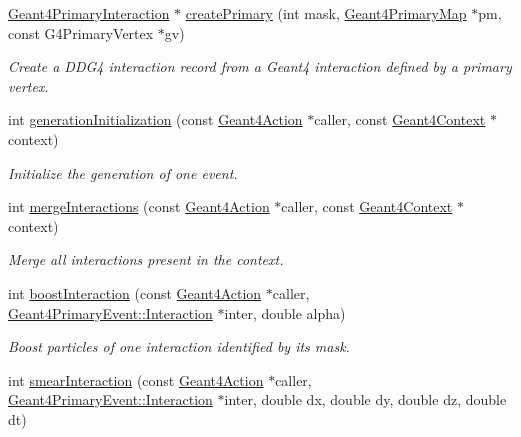 \begin{DoxyCompactItemize}
\hyperlink{class_d_d4hep_1_1_simulation_1_1_geant4_primary_interaction}{Geant4PrimaryInteraction} $\ast$ \hyperlink{namespace_d_d4hep_1_1_simulation_a36acd8dbd545f60bf3b6c7f06209898e}{createPrimary} (int mask, \hyperlink{class_d_d4hep_1_1_simulation_1_1_geant4_primary_map}{Geant4PrimaryMap} $\ast$pm, const G4PrimaryVertex $\ast$gv)
\begin{DoxyCompactList}\small\item\em Create a DDG4 interaction record from a Geant4 interaction defined by a primary vertex. \item\end{DoxyCompactList}\item 
int \hyperlink{namespace_d_d4hep_1_1_simulation_aaf70bd3ee9651c20efdf16a10dfa8dc8}{generationInitialization} (const \hyperlink{class_d_d4hep_1_1_simulation_1_1_geant4_action}{Geant4Action} $\ast$caller, const \hyperlink{class_d_d4hep_1_1_simulation_1_1_geant4_context}{Geant4Context} $\ast$context)
\begin{DoxyCompactList}\small\item\em Initialize the generation of one event. \item\end{DoxyCompactList}\item 
int \hyperlink{namespace_d_d4hep_1_1_simulation_a443dcc90d4d35ae2cab73956bbd2a2d8}{mergeInteractions} (const \hyperlink{class_d_d4hep_1_1_simulation_1_1_geant4_action}{Geant4Action} $\ast$caller, const \hyperlink{class_d_d4hep_1_1_simulation_1_1_geant4_context}{Geant4Context} $\ast$context)
\begin{DoxyCompactList}\small\item\em Merge all interactions present in the context. \item\end{DoxyCompactList}\item 
int \hyperlink{namespace_d_d4hep_1_1_simulation_a5af9f919753af128d90ae3bc13dc1c34}{boostInteraction} (const \hyperlink{class_d_d4hep_1_1_simulation_1_1_geant4_action}{Geant4Action} $\ast$caller, \hyperlink{class_d_d4hep_1_1_simulation_1_1_geant4_primary_interaction}{Geant4PrimaryEvent::Interaction} $\ast$inter, double alpha)
\begin{DoxyCompactList}\small\item\em Boost particles of one interaction identified by its mask. \item\end{DoxyCompactList}\item 
int \hyperlink{namespace_d_d4hep_1_1_simulation_a139e5502767fe9672b4d32c1e276aec3}{smearInteraction} (const \hyperlink{class_d_d4hep_1_1_simulation_1_1_geant4_action}{Geant4Action} $\ast$caller, \hyperlink{class_d_d4hep_1_1_simulation_1_1_geant4_primary_interaction}{Geant4PrimaryEvent::Interaction} $\ast$inter, double dx, double dy, double dz, double dt)

\end{DoxyCompactItemize}

